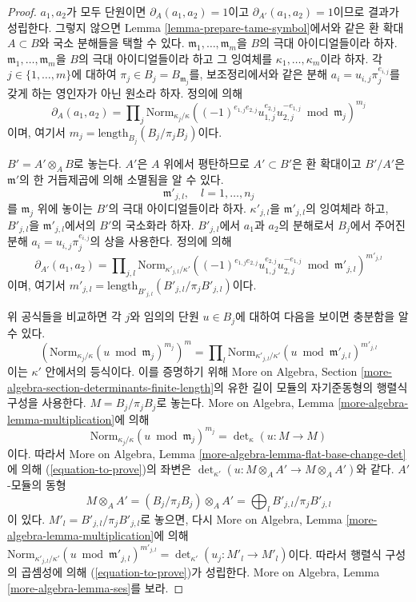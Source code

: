 \begin{proof}
$a_1, a_2$가 모두 단원이면 $\partial_A(a_1, a_2) = 1$이고
$\partial_{A'}(a_1, a_2) = 1$이므로 결과가 성립한다. 그렇지 않으면
Lemma \ref{lemma-prepare-tame-symbol}에서와 같은 환 확대 $A \subset B$와
국소 분해들을 택할 수 있다. $\mathfrak m_1, \ldots, \mathfrak m_m$을
$B$의 극대 아이디얼들이라 하자. $\mathfrak m_1, \ldots, \mathfrak m_m$을
$B$의 극대 아이디얼들이라 하고 그 잉여체를
$\kappa_1, \ldots, \kappa_m$이라 하자. 각
$j \in \{1, \ldots, m\}$에 대하여
$\pi_j \in B_j = B_{\mathfrak m_j}$를, 보조정리에서와 같은 분해
$a_i = u_{i, j}\pi_j^{e_{i, j}}$를 갖게 하는 영인자가 아닌 원소라 하자.
정의에 의해
$$
\partial_A(a_1, a_2) = \prod\nolimits_j
\text{Norm}_{\kappa_j/\kappa}
((-1)^{e_{1, j}e_{2, j}}u_{1, j}^{e_{2, j}}u_{2, j}^{-e_{1, j}}
\bmod \mathfrak m_j)^{m_j}
$$
이며, 여기서 $m_j = \text{length}_{B_j}(B_j/\pi_j B_j)$이다.

\medskip\noindent
$B' = A' \otimes_A B$로 놓는다. $A'$은 $A$ 위에서 평탄하므로
$A' \subset B'$은 환 확대이고 $B'/A'$은 $\mathfrak m'$의 한 거듭제곱에
의해 소멸됨을 알 수 있다.
$$
\mathfrak m'_{j, l},\quad l = 1, \ldots, n_j
$$
를 $\mathfrak m_j$ 위에 놓이는 $B'$의 극대 아이디얼들이라 하자.
$\kappa'_{j, l}$을 $\mathfrak m'_{j, l}$의 잉여체라 하고,
$B'_{j, l}$을 $\mathfrak m'_{j, l}$에서의 $B'$의 국소화라 하자.
$B'_{j, l}$에서 $a_1$과 $a_2$의 분해로서 $B_j$에서 주어진 분해
$a_i = u_{i, j} \pi_j^{e_{i, j}}$의 상을 사용한다. 정의에 의해
$$
\partial_{A'}(a_1, a_2) = \prod\nolimits_{j, l}
\text{Norm}_{\kappa'_{j, l}/\kappa'}
((-1)^{e_{1, j}e_{2, j}}u_{1, j}^{e_{2, j}}u_{2, j}^{-e_{1, j}}
\bmod \mathfrak m'_{j, l})^{m'_{j, l}}
$$
이며, 여기서
$m'_{j, l} = \text{length}_{B'_{j, l}}(B'_{j, l}/\pi_j B'_{j, l})$이다.

\medskip\noindent
위 공식들을 비교하면 각 $j$와 임의의 단원 $u \in B_j$에 대하여
다음을 보이면 충분함을 알 수 있다.
\begin{equation}
\label{equation-to-prove}
\left(\text{Norm}_{\kappa_j/\kappa}(u \bmod \mathfrak m_j)^{m_j}\right)^m
=
\prod\nolimits_l
\text{Norm}_{\kappa'_{j, l}/\kappa'}(u \bmod \mathfrak m'_{j, l})^{m'_{j, l}}
\end{equation}
이는 $\kappa'$ 안에서의 등식이다. 이를 증명하기 위해 More on Algebra,
Section \ref{more-algebra-section-determinants-finite-length}의 유한 길이
모듈의 자기준동형의 행렬식 구성을 사용한다. $M = B_j/\pi_j B_j$로
놓는다. More on Algebra, Lemma
\ref{more-algebra-lemma-multiplication}에 의해
$$
\text{Norm}_{\kappa_j/\kappa}(u \bmod \mathfrak m_j)^{m_j} =
\det\nolimits_\kappa(u : M \to M)
$$
이다. 따라서 More on Algebra, Lemma
\ref{more-algebra-lemma-flat-base-change-det}에 의해
(\ref{equation-to-prove})의 좌변은
$\det_{\kappa'}(u : M \otimes_A A' \to M \otimes_A A')$와 같다.
$A'$-모듈의 동형
$$
M \otimes_A A' = (B_j/\pi_j B_j) \otimes_A A' =
\bigoplus\nolimits_l B'_{j, l}/\pi_j B'_{j, l}
$$
이 있다. $M'_l = B'_{j, l}/\pi_j B'_{j, l}$로 놓으면, 다시 More on
Algebra, Lemma \ref{more-algebra-lemma-multiplication}에 의해
$\text{Norm}_{\kappa'_{j, l}/\kappa'}(u \bmod \mathfrak m'_{j, l})^{m'_{j, l}}
= \det_{\kappa'}(u_j : M'_l \to M'_l)$이다. 따라서 행렬식 구성의
곱셈성에 의해 (\ref{equation-to-prove})가 성립한다. More on Algebra,
Lemma \ref{more-algebra-lemma-ses}를 보라.
\end{proof}
